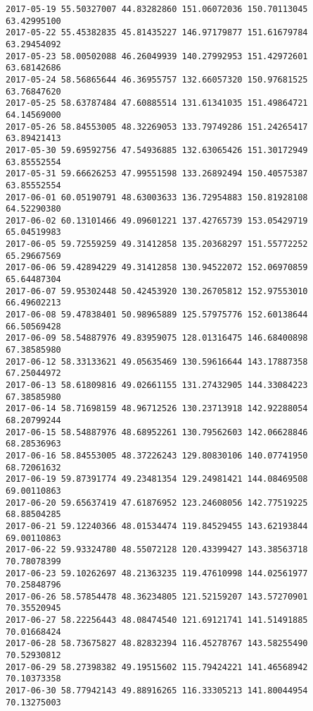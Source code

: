 \documentclass[11pt]{article}
\begin{document}
\begin{Verbatim}[commandchars=\\\{\}]
2017-05-19 55.50327007 44.83282860 151.06072036 150.70113045 63.42995100   
2017-05-22 55.45382835 45.81435227 146.97179877 151.61679784 63.29454092   
2017-05-23 58.00502088 46.26049939 140.27992953 151.42972601 63.68142686   
2017-05-24 58.56865644 46.36955757 132.66057320 150.97681525 63.76847620   
2017-05-25 58.63787484 47.60885514 131.61341035 151.49864721 64.14569000   
2017-05-26 58.84553005 48.32269053 133.79749286 151.24265417 63.89421413   
2017-05-30 59.69592756 47.54936885 132.63065426 151.30172949 63.85552554   
2017-05-31 59.66626253 47.99551598 133.26892494 150.40575387 63.85552554   
2017-06-01 60.05190791 48.63003633 136.72954883 150.81928108 64.52290380   
2017-06-02 60.13101466 49.09601221 137.42765739 153.05429719 65.04519983   
2017-06-05 59.72559259 49.31412858 135.20368297 151.55772252 65.29667569   
2017-06-06 59.42894229 49.31412858 130.94522072 152.06970859 65.64487304   
2017-06-07 59.95302448 50.42453920 130.26705812 152.97553010 66.49602213   
2017-06-08 59.47838401 50.98965889 125.57975776 152.60138644 66.50569428   
2017-06-09 58.54887976 49.83959075 128.01316475 146.68400898 67.38585980   
2017-06-12 58.33133621 49.05635469 130.59616644 143.17887358 67.25044972   
2017-06-13 58.61809816 49.02661155 131.27432905 144.33084223 67.38585980   
2017-06-14 58.71698159 48.96712526 130.23713918 142.92288054 68.20799244   
2017-06-15 58.54887976 48.68952261 130.79562603 142.06628846 68.28536963   
2017-06-16 58.84553005 48.37226243 129.80830106 140.07741950 68.72061632   
2017-06-19 59.87391774 49.23481354 129.24981421 144.08469508 69.00110863   
2017-06-20 59.65637419 47.61876952 123.24608056 142.77519225 68.88504285   
2017-06-21 59.12240366 48.01534474 119.84529455 143.62193844 69.00110863   
2017-06-22 59.93324780 48.55072128 120.43399427 143.38563718 70.78078399   
2017-06-23 59.10262697 48.21363235 119.47610998 144.02561977 70.25848796   
2017-06-26 58.57854478 48.36234805 121.52159207 143.57270901 70.35520945   
2017-06-27 58.22256443 48.08474540 121.69121741 141.51491885 70.01668424   
2017-06-28 58.73675827 48.82832394 116.45278767 143.58255490 70.52930812   
2017-06-29 58.27398382 49.19515602 115.79424221 141.46568942 70.10373358   
2017-06-30 58.77942143 49.88916265 116.33305213 141.80044954 70.13275003   


\end{Verbatim}
\end{document}
